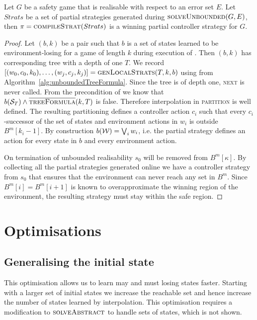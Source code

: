 \begin{theorem}
    Let $G$ be a safety game that is realisable with respect to an error set $E$. Let $Strats$ be a set of partial strategies generated during $\textsc{solveUnbounded}(G, E)$, then $\pi = \textsc{compileStrat}(Strats)$ is a winning partial controller strategy for $G$.
\end{theorem}
\begin{proof}
    Let $(b, k)$ be a pair such that $b$ is a set of states learned to be environment-losing for a game of length $k$ during execution of . Then $(b, k)$ has corresponding tree with a depth of one $T$. We record $[(w_0, c_0, k_0), \ldots, (w_j, c_j, k_j)] = \textsc{genLocalStrats}(T, k, b)$ using \opptf from Algorithm~\ref{alg:unboundedTreeFormula}. Since the tree is of depth one, \textsc{next} is never called.  From the precondition of  we know that $b(\mathcal{S}_T) \land \textsc{$\overline{\mbox{treeFormula}}$}(k, T)$ is false. Therefore interpolation in \textsc{partition} is well defined. The resulting partitioning defines a controller action $c_i$ such that every $c_i$-successor of the set of states and environment actions in $w_i$ is outside $B^m[k_i-1]$. By construction $b(\mathcal{W}) = \bigvee_i w_i$, i.e. the partial strategy defines an action for every state in $b$ and every environment action.

    On termination of unbounded realisability $s_0$ will be removed from $B^m[\kappa]$. By collecting all the partial strategies generated online we have a controller strategy from $s_0$ that ensures that the environment can never reach any set in $B^m$. Since $B^m[i] = B^m[i+1]$ is known to overapproximate the winning region of the environment, the resulting strategy must stay within the safe region.
\end{proof}

\section{Optimisations}

\subsection{Generalising the initial state}

This optimisation allows us to learn may and must losing states faster.
Starting with a larger set of initial states we increase the reachable set and
hence increase the number of states learned by interpolation. This optimisation
requires a modification to $\textsc{solveAbstract}$ to handle sets of states,
which is not shown.

